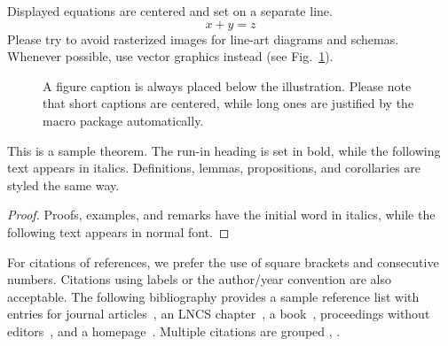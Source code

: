\documentclass[runningheads]{llncs}
\begin{document}
\noindent Displayed equations are centered and set on a separate
line.
\begin{equation}
x + y = z
\end{equation}
Please try to avoid rasterized images for line-art diagrams and
schemas. Whenever possible, use vector graphics instead (see
Fig.~\ref{fig1}).

\begin{figure}
\caption{A figure caption is always placed below the illustration.
Please note that short captions are centered, while long ones are
justified by the macro package automatically.} \label{fig1}
\end{figure}

\begin{theorem}
This is a sample theorem. The run-in heading is set in bold, while
the following text appears in italics. Definitions, lemmas,
propositions, and corollaries are styled the same way.
\end{theorem}
%
%
\begin{proof}
Proofs, examples, and remarks have the initial word in italics,
while the following text appears in normal font.
\end{proof}
For citations of references, we prefer the use of square brackets
and consecutive numbers. Citations using labels or the author/year
convention are also acceptable. The following bibliography provides
a sample reference list with entries for journal
articles~\cite{ref_article1}, an LNCS chapter~\cite{ref_lncs1}, a
book~\cite{ref_book1}, proceedings without editors~\cite{ref_proc1},
and a homepage~\cite{ref_url1}. Multiple citations are grouped
\cite{ref_article1,ref_lncs1,ref_book1},
\cite{ref_article1,ref_book1,ref_proc1,ref_url1}.
\end{document}
